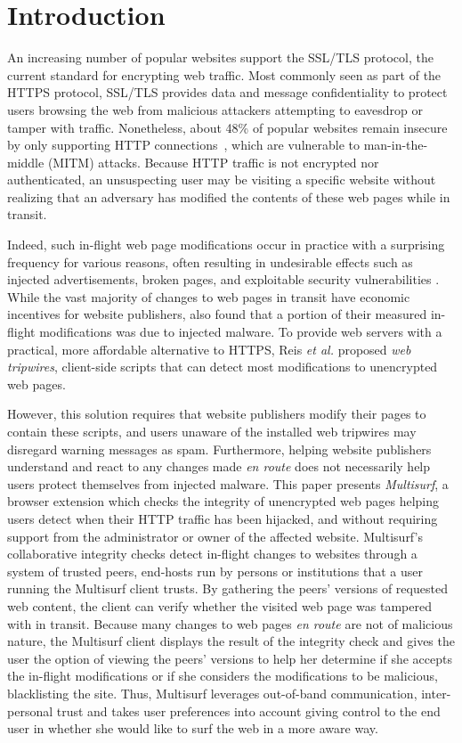 \section{Introduction}
\label{sec:intro}

An increasing number of popular websites support the SSL/TLS protocol, the current standard for encrypting web traffic.
Most commonly seen as part of the HTTPS protocol, SSL/TLS provides data and message confidentiality to protect users browsing the web from malicious attackers attempting to eavesdrop or tamper with traffic. 
Nonetheless, about 48\% of popular websites remain insecure by only supporting HTTP connections~\cite{sslpulse}, which are vulnerable to man-in-the-middle (MITM) attacks.
Because HTTP traffic is not encrypted nor authenticated, an unsuspecting user may be visiting a specific website without realizing that an adversary has modified the contents of these web pages while in transit.

Indeed, such in-flight web page modifications occur in practice with a surprising frequency for various reasons, often resulting in undesirable effects such as injected advertisements, broken pages, and exploitable security vulnerabilities \cite{reis2008detecting}. 
While the vast majority of changes to web pages in transit have economic incentives for website publishers, \cite{reis2008detecting} also found that a portion of their measured in-flight modifications was due to injected malware.
To provide web servers with a practical, more affordable alternative to HTTPS, Reis \emph{et al.} \cite{reis2008detecting} proposed \emph{web tripwires}, client-side scripts that can detect most modifications to unencrypted web pages.

However, this solution requires that website publishers modify their pages to contain these scripts, and users unaware of the installed web tripwires may disregard warning messages as spam.
Furthermore, helping website publishers understand and react to any changes made \emph{en route} does not necessarily help users protect themselves from injected malware.
This paper presents \emph{Multisurf}, a browser extension which checks the integrity of unencrypted web pages helping users detect when their HTTP traffic has been hijacked, and without requiring support from the administrator or owner of the affected website. 
Multisurf's collaborative integrity checks detect in-flight changes to websites through a system of trusted peers, end-hosts run by persons or institutions that a user running the Multisurf client trusts. 
By gathering the peers' versions of requested web content, the client can verify whether the visited web page was tampered with in transit.
Because many changes to web pages \emph{en route} are not of malicious nature, the Multisurf client displays the result of the integrity check and gives the user the option of viewing the peers' versions to help her determine if she accepts the in-flight modifications or if she considers the modifications to be malicious, blacklisting the site. 
Thus, Multisurf leverages out-of-band communication, inter-personal trust and takes user preferences into account giving control to the end user in whether she would like to surf the web in a more aware way.

